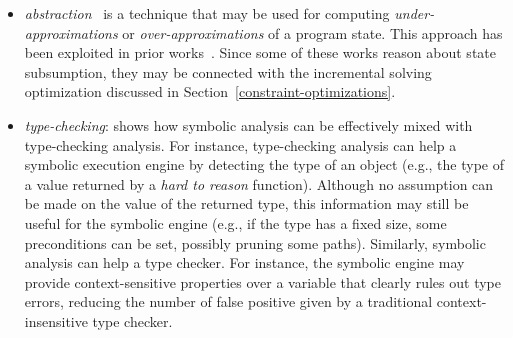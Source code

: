 \begin{itemize}
  \item {\em abstraction}~\cite{C-SEFM07} is a technique that may be used for computing {\em under-approximations} or {\em over-approximations} of a program state. This approach has been exploited in prior works~\cite{APV-SPIN06,VPP-ISSTA06,XGM-ISSTA08}. Since some of these works reason about state subsumption, they may be connected with the incremental solving optimization discussed in Section~\ref{constraint-optimizations}.
  \item {\em type-checking}: \cite{KCF-PLDI10} shows how symbolic analysis can be effectively mixed with type-checking analysis. For instance, type-checking analysis can help a symbolic execution engine by detecting the type of an object (e.g., the type of a value returned by a {\em hard to reason} function). Although no assumption can be made on the value of the returned type, this information may still be useful for the symbolic engine (e.g., if the type has a fixed size, some preconditions can be set, possibly pruning some paths). Similarly, symbolic analysis can help a type checker. For instance, the symbolic engine may provide context-sensitive properties over a variable that clearly rules out type errors, reducing the number of false positive given by a traditional context-insensitive type checker.
\end{itemize}

